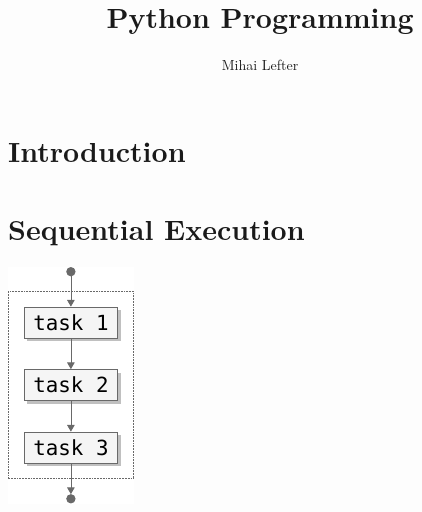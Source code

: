 \documentclass[aspectratio=1610,t]{beamer}
\author{Mihai Lefter}
\title{Python Programming}
\begin{document}


\section{Introduction}
\makeTableOfContents




\section{Sequential Execution}

\begin{pframe}
 \begin{center}
   \includegraphics[width=0.25\textwidth]{../../images/flow_sequential.pdf}
 \end{center}
\end{pframe}
\end{document}
